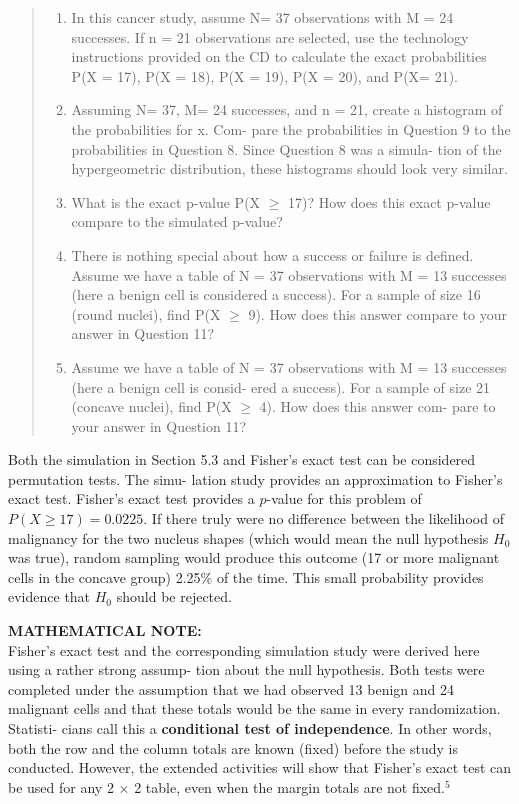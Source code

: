 \documentclass[
]{report}
\providecommand{\tightlist}{%
  \setlength{\itemsep}{0pt}\setlength{\parskip}{0pt}}
\begin{document}
\begin{quote}
\begin{enumerate}
\def\labelenumi{\arabic{enumi}.}
\setcounter{enumi}{8}
\tightlist
\item
  In this cancer study, assume N= 37 observations with M = 24 successes. If n = 21 observations
  are selected, use the technology instructions provided on the CD to calculate the exact probabilities
  P(X = 17), P(X = 18), P(X = 19), P(X = 20), and P(X= 21).
\item
  Assuming N= 37, M= 24 successes, and n = 21, create a histogram of the probabilities for x. Com-
  pare the probabilities in Question 9 to the probabilities in Question 8. Since Question 8 was a simula-
  tion of the hypergeometric distribution, these histograms should look very similar.
\item
  What is the exact p-value P(X \(\geq\) 17)? How does this exact p-value compare to the simulated
  p-value?
\item
  There is nothing special about how a success or failure is defined. Assume we have a table of
  N = 37 observations with M = 13 successes (here a benign cell is considered a success). For a
  sample of size 16 (round nuclei), find P(X \(\geq\) 9). How does this answer compare to your answer in
  Question 11?
\item
  Assume we have a table of N = 37 observations with M = 13 successes (here a benign cell is consid-
  ered a success). For a sample of size 21 (concave nuclei), find P(X \(\geq\) 4). How does this answer com-
  pare to your answer in Question 11?
\end{enumerate}
\end{quote}

Both the simulation in Section 5.3 and Fisher's exact test can be considered permutation tests. The simu-
lation study provides an approximation to Fisher's exact test. Fisher's exact test provides a \(p\)-value for this
problem of \(P(X \geq 17)= 0.0225\). If there truly were no difference between the likelihood of malignancy for
the two nucleus shapes (which would mean the null hypothesis \(H_0\) was true), random sampling would produce
this outcome (17 or more malignant cells in the concave group) 2.25\% of the time. This small probability
provides evidence that \(H_0\) should be rejected.

\large

\textbf{MATHEMATICAL NOTE:}\\
Fisher's exact test and the corresponding simulation study were derived here using a rather strong assump-
tion about the null hypothesis. Both tests were completed under the assumption that we had observed 13
benign and 24 malignant cells and that these totals would be the same in every randomization. Statisti-
cians call this a \textbf{conditional test of independence}. In other words, both the row and the column totals
are known (fixed) before the study is conducted. However, the extended activities will show that Fisher's
exact test can be used for any 2 \(\times\) 2 table, even when the margin totals are not fixed.\(^5\)
\normalsize 
\end{document}
